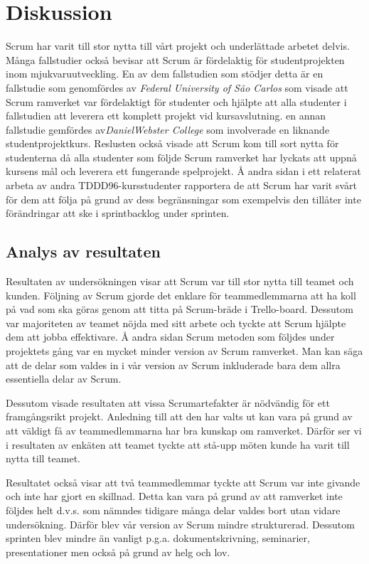 
\section{Diskussion}
\label{sec:Lieth_Wahid-discussion}
Scrum har varit till stor nytta till vårt projekt och underlättade arbetet delvis. Många fallstudier också bevisar att Scrum är fördelaktig för studentprojekten inom mjukvaruutveckling. En av dem fallstudien som stödjer detta är
en fallstudie som genomfördes av \textit{Federal University of São Carlos} som visade att Scrum ramverket var fördelaktigt för studenter och hjälpte att alla studenter i fallstudien att leverera ett komplett projekt vid kursavslutning. en annan fallstudie gemfördes av\textit{DanielWebster College} som involverade en liknande studentprojektkurs.\cite{GameDesign} Reslusten också visade att Scrum kom till sort nytta för studenterna då alla studenter som följde Scrum ramverket har lyckats att uppnå kursens mål och leverera ett fungerande spelprojekt. Å andra sidan i ett relaterat arbeta av andra TDDD96-kursstudenter rapportera de att Scrum har varit svårt för dem att följa på grund av dess begränsningar som exempelvis den tillåter inte förändringar att ske i sprintbacklog under sprinten.\cite{overvakn73:online}


\subsection{Analys av resultaten}
Resultaten av undersökningen visar att Scrum var till stor nytta till teamet och kunden. Följning av Scrum gjorde det enklare för teammedlemmarna att ha koll på vad som ska göras genom att titta på Scrum-bräde i Trello-board. Dessutom var majoriteten av teamet nöjda med sitt arbete och tyckte att Scrum hjälpte dem att jobba effektivare. Å andra sidan Scrum metoden som följdes under projektets gång var en mycket minder version av Scrum ramverket. Man kan säga att de delar som valdes in i vår version av Scrum inkluderade bara dem allra essentiella delar av Scrum.

Dessutom visade resultaten att vissa Scrumartefakter är nödvändig för ett framgångsrikt projekt. Anledning till att den har valts ut kan vara på grund av att väldigt få av teammedlemmarna har bra kunskap om ramverket. Därför ser vi i resultaten av enkäten att teamet tyckte att stå-upp möten kunde ha varit till nytta till teamet. 

Resultatet också visar att två teammedlemmar tyckte att Scrum var inte givande och inte har gjort en skillnad. Detta kan vara på grund av att ramverket inte följdes helt d.v.s. som nämndes tidigare många delar valdes bort utan vidare undersökning. Därför blev vår version av Scrum mindre strukturerad. Dessutom sprinten blev mindre än vanligt p.g.a. dokumentskrivning, seminarier, presentationer men också på grund av helg och lov.
